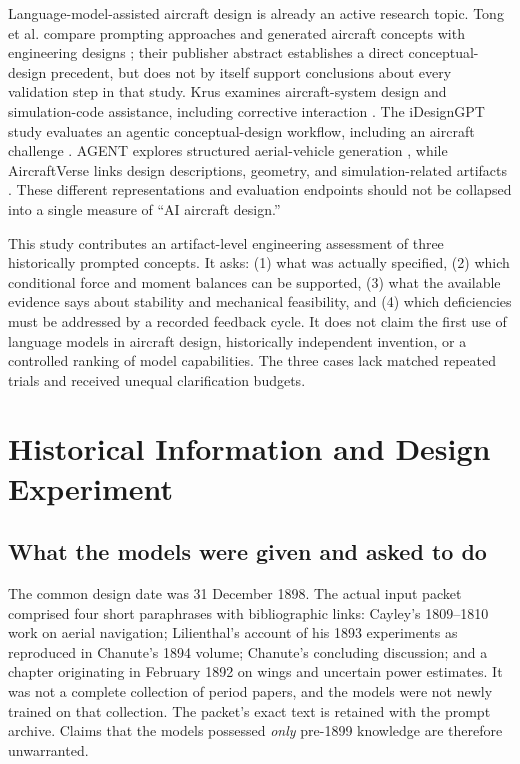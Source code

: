 \documentclass[11pt,a4paper]{article}
\begin{document}
Language-model-assisted aircraft design is already an active research topic. Tong et al. compare prompting approaches and generated aircraft concepts with engineering designs \cite{ref25}; their publisher abstract establishes a direct conceptual-design precedent, but does not by itself support conclusions about every validation step in that study. Krus examines aircraft-system design and simulation-code assistance, including corrective interaction \cite{ref26}. The iDesignGPT study evaluates an agentic conceptual-design workflow, including an aircraft challenge \cite{ref27}. AGENT explores structured aerial-vehicle generation \cite{ref28}, while AircraftVerse links design descriptions, geometry, and simulation-related artifacts \cite{ref29}. These different representations and evaluation endpoints should not be collapsed into a single measure of ``AI aircraft design.''

This study contributes an artifact-level engineering assessment of three historically prompted concepts. It asks: (1) what was actually specified, (2) which conditional force and moment balances can be supported, (3) what the available evidence says about stability and mechanical feasibility, and (4) which deficiencies must be addressed by a recorded feedback cycle. It does not claim the first use of language models in aircraft design, historically independent invention, or a controlled ranking of model capabilities. The three cases lack matched repeated trials and received unequal clarification budgets.

\section{Historical Information and Design Experiment}
\subsection{What the models were given and asked to do}
The common design date was 31 December 1898. The actual input packet comprised four short paraphrases with bibliographic links: Cayley's 1809--1810 work on aerial navigation; Lilienthal's account of his 1893 experiments as reproduced in Chanute's 1894 volume; Chanute's concluding discussion; and a chapter originating in February 1892 on wings and uncertain power estimates. It was not a complete collection of period papers, and the models were not newly trained on that collection. The packet's exact text is retained with the prompt archive. Claims that the models possessed \emph{only} pre-1899 knowledge are therefore unwarranted.
\end{document}
